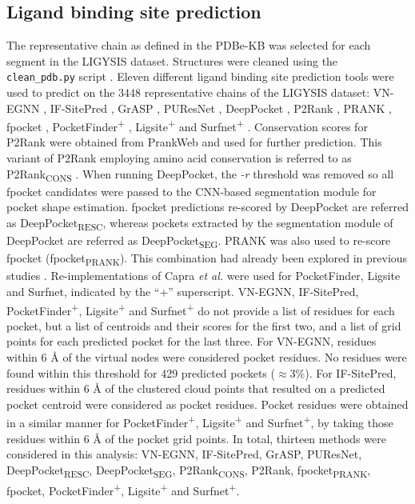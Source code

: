\subsection{Ligand binding site prediction}

The representative chain as defined in the PDBe-KB was selected for each segment in the LIGYSIS dataset. Structures were cleaned using the \texttt{clean\_pdb.py} script \cite{JUBB_2019_PDBTOOLS}. Eleven different ligand binding site prediction tools were used to predict on the 3448 representative chains of the LIGYSIS dataset: VN-EGNN \cite{SESTAK_2024_VNEGNN}, IF-SitePred \cite{CARBERY_2024_IFSP}, GrASP \cite{SMITH_2024_GrASP}, PUResNet \cite{KANDEL_2021_PURESNET, KANDEL_2024_PURESNET}, DeepPocket \cite{AGGARWAL_2022_DEEPPOCKET}, P2Rank \cite{KRIVAK_2015_P2RANK, KRIVAK_2018_P2RANK}, PRANK \cite{KRIVAK_2015_PRANK}, fpocket \cite{GUILLOUX_2009_FPOCKET, SCHMIDTKE_2010_FPOCKET2}, PocketFinder\textsuperscript{+} \cite{AN_2005_POCKETFINDER}, Ligsite\textsuperscript{+} \cite{HENDLICH_1997_LIGSITE} and Surfnet\textsuperscript{+} \cite{LASKOWSKI_1995_SURFNET}. Conservation scores for P2Rank were obtained from PrankWeb \cite{PRANK_WEB} and used for further prediction. This variant of P2Rank employing amino acid conservation is referred to as P2Rank\textsubscript{CONS} \cite{JENDELE_2019_PRANKWEB, JAKUBEC_2022_PRANKWEB}. When running DeepPocket, the \textit{-r} threshold was removed so all fpocket candidates were passed to the CNN-based segmentation module for pocket shape estimation. fpocket predictions re-scored by DeepPocket are referred as DeepPocket\textsubscript{RESC}, whereas pockets extracted by the segmentation module of DeepPocket are referred as DeepPocket\textsubscript{SEG}. PRANK was also used to re-score fpocket (fpocket\textsubscript{PRANK}). This combination had already been explored in previous studies \cite{KRIVAK_2015_PRANK, KRIVAK_2015_P2RANK, KRIVAK_2018_P2RANK, COMAJUNCOSA_2024_POCKETS}. Re-implementations of Capra \textit{et al.} \cite{CAPRA_2009_CONCAVITY} were used for PocketFinder, Ligsite and Surfnet, indicated by the ``+'' superscript. VN-EGNN, IF-SitePred, PocketFinder\textsuperscript{+}, Ligsite\textsuperscript{+} and Surfnet\textsuperscript{+} do not provide a list of residues for each pocket, but a list of centroids and their scores for the first two, and a list of grid points for each predicted pocket for the last three. For VN-EGNN, residues within 6 \AA{} of the virtual nodes were considered pocket residues. No residues were found within this threshold for 429 predicted pockets ($\approx$3\%). For IF-SitePred, residues within 6 \AA{} of the clustered cloud points that resulted on a predicted pocket centroid were considered as pocket residues. Pocket residues were obtained in a similar manner for PocketFinder\textsuperscript{+}, Ligsite\textsuperscript{+} and Surfnet\textsuperscript{+}, by taking those residues within 6 \AA{} of the pocket grid points. In total, thirteen methods were considered in this analysis: VN-EGNN, IF-SitePred, GrASP, PUResNet, DeepPocket\textsubscript{RESC}, DeepPocket\textsubscript{SEG}, P2Rank\textsubscript{CONS}, P2Rank, fpocket\textsubscript{PRANK}, fpocket, PocketFinder\textsuperscript{+}, Ligsite\textsuperscript{+} and Surfnet\textsuperscript{+}.

